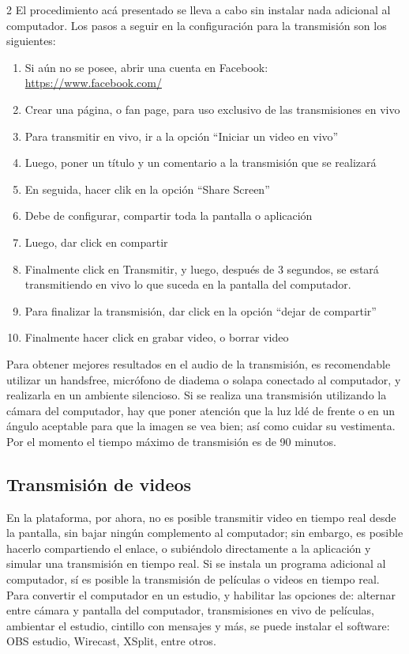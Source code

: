 \documentclass[11pt,spanish,Letterpaper,openany]{book}
\begin{document}
\begin {multicols}{2}
El procedimiento acá presentado se lleva a cabo sin instalar nada adicional al computador. Los pasos a seguir en la configuración para la transmisión son los siguientes:

\begin{enumerate}
\def\labelenumi{\alph{enumi}.}
\item
  Si aún no se posee, abrir una cuenta en Facebook: \url{https://www.facebook.com/}
\item
  Crear una página, o fan page, para uso exclusivo de las transmisiones en vivo
\item
  Para transmitir en vivo, ir a la opción ``Iniciar un video en vivo''
\item
  Luego, poner un título y un comentario a la transmisión que se realizará
\item
  En seguida, hacer clik en la opción ``Share Screen''
\item
  Debe de configurar, compartir toda la pantalla o aplicación
\item
  Luego, dar click en compartir
\item
  Finalmente click en Transmitir, y luego, después de 3 segundos, se estará transmitiendo en vivo lo que suceda en la pantalla del computador.
\item
  Para finalizar la transmisión, dar click en la opción ``dejar de compartir''
\item
  Finalmente hacer click en grabar video, o borrar video
\end{enumerate}

Para obtener mejores resultados en el audio de la transmisión, es recomendable utilizar un handsfree, micrófono de diadema o solapa conectado al computador, y realizarla en un ambiente silencioso. Si se realiza una transmisión utilizando la cámara del computador, hay que poner atención que la luz ldé de frente o en un ángulo aceptable para que la imagen se vea bien; así como cuidar su vestimenta. Por el momento el tiempo máximo de transmisión es de 90 minutos.

\hypertarget{transmision-de-videos}{%
\subsection{Transmisión de videos}\label{transmision-de-videos}}

En la plataforma, por ahora, no es posible transmitir video en tiempo real desde la pantalla, sin bajar ningún complemento al computador; sin embargo, es posible hacerlo compartiendo el enlace, o subiéndolo directamente a la aplicación y simular una transmisión en tiempo real. Si se instala un programa adicional al computador, sí es posible la transmisión de películas o videos en tiempo real. Para convertir el computador en un estudio, y habilitar las opciones de: alternar entre cámara y pantalla del computador, transmisiones en vivo de películas, ambientar el estudio, cintillo con mensajes y más, se puede instalar el software: OBS estudio, Wirecast, XSplit, entre otros.


\end{multicols}
\end{document}
